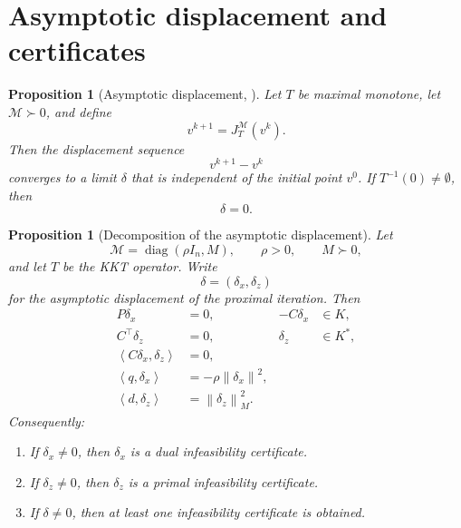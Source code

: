 \documentclass[a4paper,11pt]{book}
\theoremstyle{plain}
\newtheorem{proposition}[theorem]{Proposition}
\theoremstyle{definition}
\theoremstyle{remark}
\numberwithin{equation}{chapter}
\numberwithin{algorithm}{chapter}
\newcommand{\norm}[1]{\left\|#1\right\|}
\newcommand{\inner}[2]{\left\langle #1, #2 \right\rangle}
\newcommand{\diag}{\operatorname{diag}}
\begin{document}
	\section{Asymptotic displacement and certificates}
	
	\begin{proposition}[Asymptotic displacement, \cite{Pazy1971}]
		Let \(T\) be maximal monotone, let \(\mathcal M\succ0\), and define
		\[
		v^{k+1}=J_T^{\mathcal M}(v^k).
		\]
		Then the displacement sequence
		\[
		v^{k+1}-v^k
		\]
		converges to a limit \(\delta\) that is independent of the initial point
		\(v^0\). If \(T^{-1}(0)\neq\emptyset\), then
		\[
		\delta=0.
		\]
	\end{proposition}
	
	\begin{proposition}[Decomposition of the asymptotic displacement]
		Let
		\[
		\mathcal M=\diag(\rho I_n,M),
		\qquad
		\rho>0,
		\qquad
		M\succ0,
		\]
		and let \(T\) be the KKT operator. Write
		\[
		\delta=(\delta_x,\delta_z)
		\]
		for the asymptotic displacement of the proximal iteration. Then
		\begin{align}
			P\delta_x&=0,
			&
			-C\delta_x&\in K,
			\label{eq:displacement-primal}\\
			C^\top\delta_z&=0,
			&
			\delta_z&\in K^*,
			\label{eq:displacement-dual}\\
			\inner{C\delta_x}{\delta_z}&=0,
			\label{eq:displacement-orthogonality}\\
			\inner{q}{\delta_x}
			&=
			-\rho\norm{\delta_x}^2,
			\label{eq:displacement-q}\\
			\inner{d}{\delta_z}
			&=
			\norm{\delta_z}_M^2.
			\label{eq:displacement-d}
		\end{align}
		Consequently:
		
		\begin{enumerate}
			\item If \(\delta_x\neq0\), then \(\delta_x\) is a dual infeasibility
			certificate.
			
			\item If \(\delta_z\neq0\), then \(\delta_z\) is a primal infeasibility
			certificate.
			
			\item If \(\delta\neq0\), then at least one infeasibility certificate is
			obtained.
		\end{enumerate}
	\end{proposition}
	
\end{document}
